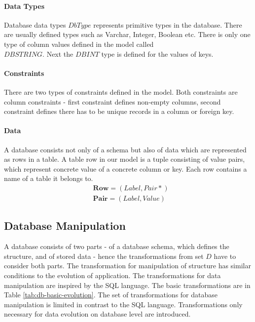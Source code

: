 \documentclass[runningheads]{comsis}
\begin{document}
\paragraph{Data Types} Database data types $DbType$ represents primitive types in the database. There are usually defined types such as Varchar, Integer, Boolean etc. There is only one type of column values defined in the model called \\ $DBSTRING$. Next the $DBINT$ type is defined for the values of keys.

\paragraph{Constraints} There are two types of constraints defined in the model. Both constraints are column constraints - first constraint defines non-empty columns, second constraint defines there has to be unique records in a column or foreign key.

\paragraph{Data} A database consists not only of a schema but also of data which are represented as rows in a table. A table row in our model is a tuple consisting of value pairs, which represent concrete value of a concrete column or key. Each row contains a name of a table it belongs to.
\begin{align}
&	\mathbf{Row} = (Label, Pair*) \\
&	\mathbf{Pair} = (Label, Value) 
\end{align}


\subsection{Database Manipulation}
\label{sec:db-evolution}
A database consists of two parts - of a database schema, which defines the structure, and of stored data - hence the transformations from set $D$ have to consider both parts. The transformation for manipulation of structure has similar conditions to the evolution of application. The transformations for data manipulation are inspired by the SQL language. The basic transformations are in Table \ref{tab:db-basic-evolution}. The set of transformations for database manipulation is limited in contrast to the SQL language. Transformations only necessary for data evolution on database level are introduced. 
\end{document}
